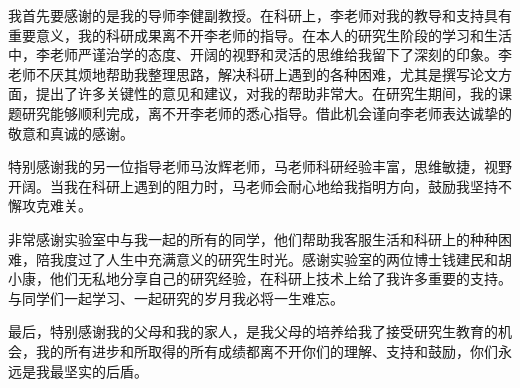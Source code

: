 \begin{thanks}
我首先要感谢的是我的导师李健副教授。在科研上，李老师对我的教导和支持具有重要意义，我的科研成果离不开李老师的指导。在本人的研究生阶段的学习和生活中，李老师严谨治学的态度、开阔的视野和灵活的思维给我留下了深刻的印象。李老师不厌其烦地帮助我整理思路，解决科研上遇到的各种困难，尤其是撰写论文方面，提出了许多关键性的意见和建议，对我的帮助非常大。在研究生期间，我的课题研究能够顺利完成，离不开李老师的悉心指导。借此机会谨向李老师表达诚挚的敬意和真诚的感谢。

特别感谢我的另一位指导老师马汝辉老师，马老师科研经验丰富，思维敏捷，视野开阔。当我在科研上遇到的阻力时，马老师会耐心地给我指明方向，鼓励我坚持不懈攻克难关。	

非常感谢实验室中与我一起的所有的同学，他们帮助我客服生活和科研上的种种困难，陪我度过了人生中充满意义的研究生时光。感谢实验室的两位博士钱建民和胡小康，他们无私地分享自己的研究经验，在科研上技术上给了我许多重要的支持。与同学们一起学习、一起研究的岁月我必将一生难忘。

最后，特别感谢我的父母和我的家人，是我父母的培养给我了接受研究生教育的机会，我的所有进步和所取得的所有成绩都离不开你们的理解、支持和鼓励，你们永远是我最坚实的后盾。


\end{thanks}
